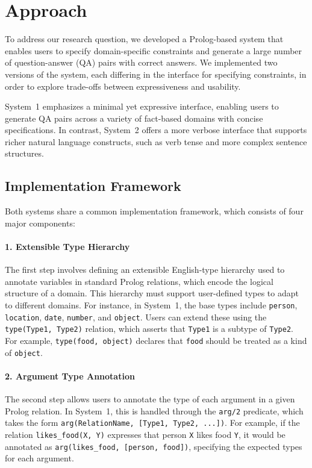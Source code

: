 \documentclass{article}
\begin{document}
\section{Approach}

To address our research question, we developed a Prolog-based system that enables users to specify domain-specific 
constraints and generate a large number of question-answer (QA) pairs with correct answers. We implemented two versions 
of the system, each differing in the interface for specifying constraints, in order to explore trade-offs between 
expressiveness and usability.

System~1 emphasizes a minimal yet expressive interface, enabling users to generate QA pairs across a variety of 
fact-based domains with concise specifications. In contrast, System~2 offers a more verbose interface that supports 
richer natural language constructs, such as verb tense and more complex sentence structures.

\subsection{Implementation Framework}

Both systems share a common implementation framework, which consists of four major components:

\paragraph{1. Extensible Type Hierarchy} 
The first step involves defining an extensible English-type hierarchy used to annotate variables in standard 
Prolog relations, which encode the logical structure of a domain. This hierarchy must support user-defined types to 
adapt to different domains. For instance, in System~1, the base types include \texttt{person}, \texttt{location}, 
\texttt{date}, \texttt{number}, and \texttt{object}. Users can extend these using the \texttt{type(Type1, Type2)} 
relation, which asserts that \texttt{Type1} is a subtype of \texttt{Type2}. For example, \texttt{type(food, object)} 
declares that \texttt{food} should be treated as a kind of \texttt{object}.

\paragraph{2. Argument Type Annotation} 
The second step allows users to annotate the type of each argument in a given Prolog relation. In System~1, 
this is handled through the \texttt{arg/2} predicate, which takes the form \texttt{arg(RelationName, [Type1, Type2, ...])}. 
For example, if the relation \texttt{likes\_food(X, Y)} expresses that person \texttt{X} likes food \texttt{Y}, it would 
be annotated as \texttt{arg(likes\_food, [person, food])}, specifying the expected types for each argument.
\end{document}
